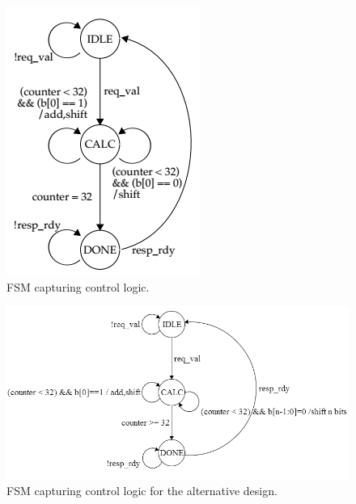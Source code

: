 \documentclass[10pt]{article}
\begin{document}
\begin{figure}[b]
\centering
\includegraphics[scale=0.6]{BaseFSM}
\caption{FSM capturing control logic.}
\label{fig:BaseFSM}
\end{figure}

\begin{figure}[b]
\centering
\includegraphics[scale=0.6]{AltFSM}
\caption{FSM capturing control logic for the alternative design.}
\label{fig:AltFSM}
\end{figure}
\end{document}
